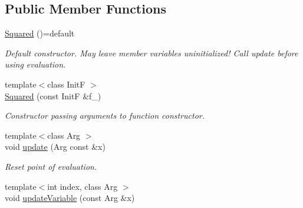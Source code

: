 \subsection*{Public Member Functions}
\begin{DoxyCompactItemize}
\item 
\hypertarget{structRFFGen_1_1MathematicalOperations_1_1Squared_a01ac39e60369d635903f4f127fab054e}{\hyperlink{structRFFGen_1_1MathematicalOperations_1_1Squared_a01ac39e60369d635903f4f127fab054e}{Squared} ()=default}\label{structRFFGen_1_1MathematicalOperations_1_1Squared_a01ac39e60369d635903f4f127fab054e}

\begin{DoxyCompactList}\small\item\em Default constructor. May leave member variables uninitialized! Call update before using evaluation. \end{DoxyCompactList}\item 
{\footnotesize template$<$class Init\-F $>$ }\\\hyperlink{structRFFGen_1_1MathematicalOperations_1_1Squared_a8d89d011bdb0456471b02722df029125}{Squared} (const Init\-F \&f\-\_\-)
\begin{DoxyCompactList}\small\item\em Constructor passing arguments to function constructor. \end{DoxyCompactList}\item 
\hypertarget{structRFFGen_1_1MathematicalOperations_1_1Squared_a4b586d514777bd9b670a1c640507cb88}{{\footnotesize template$<$class Arg $>$ }\\void \hyperlink{structRFFGen_1_1MathematicalOperations_1_1Squared_a4b586d514777bd9b670a1c640507cb88}{update} (Arg const \&x)}\label{structRFFGen_1_1MathematicalOperations_1_1Squared_a4b586d514777bd9b670a1c640507cb88}

\begin{DoxyCompactList}\small\item\em Reset point of evaluation. \end{DoxyCompactList}\item 
\hypertarget{structRFFGen_1_1MathematicalOperations_1_1Squared_a2b6d89fb45e7bc60eda730ea1b767b69}{{\footnotesize template$<$int index, class Arg $>$ }\\void \hyperlink{structRFFGen_1_1MathematicalOperations_1_1Squared_a2b6d89fb45e7bc60eda730ea1b767b69}{update\-Variable} (const Arg \&x)}\label{structRFFGen_1_1MathematicalOperations_1_1Squared_a2b6d89fb45e7bc60eda730ea1b767b69}


\end{DoxyCompactItemize}
